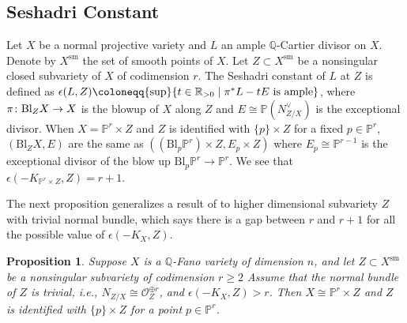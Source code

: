 \documentclass[12pt]{amsart}
\newtheorem{prop}[thm]{Proposition}
\theoremstyle{definition}
\def\sup{{\rm sup}}
\def\bl{{\rm Bl}}
\newcommand{\IP}{{\mathbb P}}
\newcommand{\IQ}{{\mathbb Q}}
\newcommand{\IR}{{\mathbb R}}
\newcommand{\CO}{{\mathcal O}}
\newcommand{\gee}{\geqslant}
\begin{document}
\subsection{Seshadri Constant} Let $X$ be a normal projective variety and $L$ an ample $\IQ$-Cartier divisor on $X$. 
Denote by $X^{\text{sm}}$ the set of smooth points of $X$. 
Let $Z\subset X^{\text{sm}}$ be a nonsingular closed subvariety of $X$ of codimension $r$. The Seshadri constant of $L$ at $Z$ is defined as $\epsilon(L,Z)\coloneqq \sup\{t\in \IR_{>0}\mid \pi^*L-tE\, \text{\,is ample}\}$, where $\pi\colon \bl_Z X\rightarrow X$ is the blowup of $X$ along $Z$ and $E\cong \IP(N_{Z/X}^{\vee})$ is the exceptional divisor. When $X = \IP^r\times Z$ and $Z$ is identified with $\{p\}\times Z$ for a fixed $p\in \IP^r$, $(\mathrm{Bl}_Z X, E)$ are the same as $((\mathrm{Bl}_{p}\IP^r)\times Z, E_p\times Z)$ where $E_p\cong \IP^{r-1}$ is the exceptional divisor of the blow up $\mathrm{Bl}_p \IP^r\rightarrow \IP^r$. We see that $\epsilon(-K_{\IP^r\times Z},Z) = r+1$. 

The next proposition generalizes a result of \cite{LZ18} to higher dimensional subvariety $Z$ with trivial normal bundle, which says there is a gap between $r$ and $r+1$ for all the possible value of $\epsilon(-K_X,Z)$.

\begin{prop}\label{prop-LZ}
    Suppose $X$ is a $\IQ$-Fano variety of dimension $n$, and let $Z \subset X^{\text{sm}}$ be a nonsingular subvariety of codimension $r\gee 2$ %
    Assume that the normal bundle of $Z$ is trivial, i.e., $N_{Z/X} \cong \CO_Z^{\oplus r}$, and $\epsilon(-K_X,Z)>r$.
    Then $X \cong \IP^r\times Z$ and $Z$ is identified with $\{p\}\times Z$ for a point $p\in \IP^r$.
\end{prop}
\end{document}
